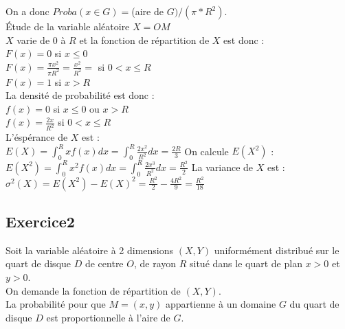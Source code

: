\documentclass[a4paper,11pt]{book}
\begin{document}
On a donc $Proba(x\in G)=$(aire de $G)/(\pi*R^2)$.\\
\'Etude de la variable al\'eatoire $X=OM$\\

$X$ varie de 0 \`a $R$ et la fonction de r\'epartition de $X$ est donc :\\
$F(x)=0$ si $x\leq 0$\\ 
$F(x)=\frac{\pi x^2}{\pi R^2}=\frac{x^2}{R^2}=$ si $0<x \leq R$\\
$F(x)=1$ si $x > R$\\
La densit\'e de probabilit\'e est donc :\\
$f(x)=0$ si $x\leq 0$ ou $x> R$\\ 
$f(x)=\frac{2x}{R^2}$ si $0<x\leq R$\\
L'\'esp\'erance de $X$ est :\\
$E(X)=\int_0^Rxf(x)dx=\int_0^R\frac{2x^2}{R^2}dx=\frac{2R}{3}$
On calcule $E(X^2)$ :
$E(X^2)=\int_0^Rx^2f(x)dx=\int_0^R\frac{2x^3}{R^2}dx=\frac{R^2}{2}$
La variance de $X$ est :\\
$\sigma^2(X)=E(X^2)-E(X)^2=\frac{R^2}{2}-\frac{4R^2}{9}=\frac{R^2}{18}$
\subsection{Exercice2}
Soit la variable al\'eatoire \`a 2 dimensions $(X,Y)$ uniform\'ement distribu\'e
sur le quart de disque $D$ de centre $O$, de rayon $R$ situ\'e dans le quart de
 plan $x>0$ et $y>0$.\\
On demande la fonction de r\'epartition de $(X,Y)$.\\
La probabilit\'e pour que $M=(x,y)$ appartienne \`a un domaine $G$ du  quart de
 disque $D$ est proportionnelle \`a l'aire de $G$.\\
\end{document}
